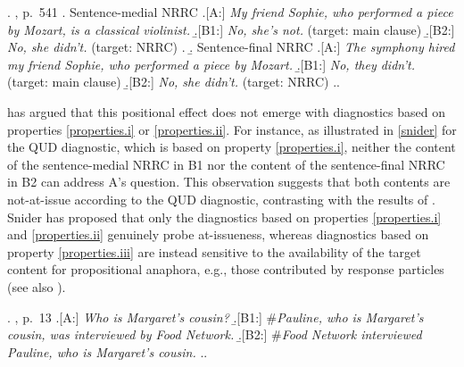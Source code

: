 \documentclass[times,linguex]{glossa}
\begin{document}
\ex.\label{ex:sk} \citealt{syrett_experimental_2015}, p.~541
\a. Sentence-medial NRRC
\a.[A:] \emph{My friend Sophie, who performed a piece by Mozart, is a classical violinist.}
\b.[B1:] \emph{No, she's not.} \hfill (target: main clause)
\b.[B2:] \emph{No, she didn't.} \hfill (target: NRRC)
\z.
\b. Sentence-final NRRC
\a.[A:] \emph{The symphony hired my friend Sophie, who performed a piece by Mozart.}
\b.[B1:] \emph{No, they didn't.} \hfill (target: main clause)
\b.[B2:] \emph{No, she didn't.} \hfill (target: NRRC)
\z.\z.


\citet{snider_anaphoric_2017} has argued that this positional effect does not emerge with diagnostics based on properties \ref{properties.i} or \ref{properties.ii}. For instance, as illustrated in \ref{snider} for the QUD diagnostic, which is based on property \ref{properties.i}, neither the content of the sentence-medial NRRC in B1 nor the content of the sentence-final NRRC in B2 can address A's question. This observation suggests that both contents are not-at-issue according to the QUD diagnostic, contrasting with the results of \citealt[Exp.~2]{syrett_experimental_2015}. Snider has proposed that only the diagnostics based on properties \ref{properties.i} and \ref{properties.ii} genuinely probe at-issueness, whereas diagnostics based on property \ref{properties.iii} are instead sensitive to the availability of the target content for propositional anaphora, e.g., those contributed by response particles (see also \citealt{snider_at-issueness_2017,snider_anaphoric_2017,snider_distinguishing_2018,korotkova_evidential_2020}).

\ex.\label{snider} \citealt{snider_anaphoric_2017}, p.~13
\a.[A:] \emph{Who is Margaret's cousin?}
\b.[B1:] \#\emph{Pauline, who is Margaret's cousin, was interviewed by Food Network.}
\b.[B2:] \#\emph{Food Network interviewed Pauline, who is Margaret's cousin.} 
\z.\z.

\end{document}
